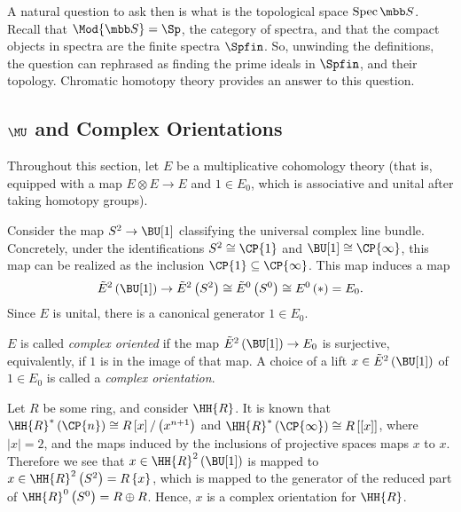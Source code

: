 A natural question to ask then is what is the topological space $\spec \SS$.
Recall that $\Mod{\SS} = \Sp$, the category of spectra, and that the compact objects in spectra are the finite spectra $\Spfin$.
So, unwinding the definitions, the question can rephrased as finding the prime ideals in $\Spfin$, and their topology.
Chromatic homotopy theory provides an answer to this question.



\subsection{\texorpdfstring{$\MU$}{MU} and Complex Orientations}

Throughout this section, let $E$ be a multiplicative cohomology theory (that is, equipped with a map $E \otimes E \to E$ and $1 \in E_0$, which is associative and unital after taking homotopy groups).

Consider the map $S^2 \to \BU[1]$ classifying the universal complex line bundle.
Concretely, under the identifications $S^2 \cong \CP{1}$ and $\BU[1] \cong \CP{\infty}$, this map can be realized as the inclusion $\CP{1} \subseteq \CP{\infty}$.
This map induces a map
$$
	\tilde{E}^2\left(\BU[1]\right)
	\to \tilde{E}^2\left(S^2\right)
	\cong \tilde{E}^0\left(S^0\right)
	\cong E^0\left(*\right)
	= E_0.
$$
Since $E$ is unital, there is a canonical generator $1 \in E_0$.

\begin{definition}
	$E$ is called \emph{complex oriented} if the map $\tilde{E}^2\left(\BU[1]\right) \to E_0$ is surjective, equivalently, if $1$ is in the image of that map.
	A choice of a lift $x \in \tilde{E}^2\left(\BU[1]\right)$ of $1 \in E_0$ is called a \emph{complex orientation}.
\end{definition}

\begin{example}\label{HR-1}
	Let $R$ be some ring, and consider $\HH{R}$.
	It is known that
	$\HH{R}^*\left(\CP{n}\right) \cong R \left[x\right] / \left(x^{n+1}\right)$
	and
	$\HH{R}^*\left(\CP{\infty}\right) \cong R \left[\left[x\right]\right]$,
	where $\left|x\right| = 2$,
	and the maps induced by the inclusions of projective spaces maps $x$ to $x$.
	Therefore we see that $x \in \HH{R}^2\left(\BU[1]\right)$ is mapped to $x \in \HH{R}^2\left(S^2\right) = R\left\{x\right\}$, which is mapped to the generator of the reduced part of $\HH{R}^0\left(S^0\right) = R \oplus R$.
	Hence, $x$ is a complex orientation for $\HH{R}$.
\end{example}

